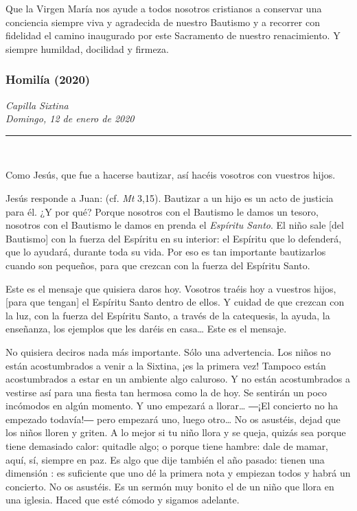 Que la Virgen María nos ayude a todos nosotros cristianos a conservar una conciencia siempre viva y agradecida de nuestro Bautismo y a recorrer con fidelidad el camino inaugurado por este Sacramento de nuestro renacimiento. Y siempre humildad, docilidad y firmeza.

\subsubsection{Homilía (2020)} \emph{Capilla Sixtina\\ Domingo, 12 de enero de 2020}

\begin{center}\rule{0.5\linewidth}{\linethickness}\end{center}

~

Como Jesús, que fue a hacerse bautizar, así hacéis vosotros con vuestros hijos.

Jesús responde a Juan:  (cf. \emph{Mt} 3,15). Bautizar a un hijo es un acto de justicia para él. ¿Y por qué? Porque nosotros con el Bautismo le damos un tesoro, nosotros con el Bautismo le damos en prenda el \emph{Espíritu Santo}. El niño sale {[}del Bautismo{]} con la fuerza del Espíritu en su interior: el Espíritu que lo defenderá, que lo ayudará, durante toda su vida. Por eso es tan importante bautizarlos cuando son pequeños, para que crezcan con la fuerza del Espíritu Santo.

Este es el mensaje que quisiera daros hoy. Vosotros traéis hoy a vuestros hijos, {[}para que tengan{]} el Espíritu Santo dentro de ellos. Y cuidad de que crezcan con la luz, con la fuerza del Espíritu Santo, a través de la catequesis, la ayuda, la enseñanza, los ejemplos que les daréis en casa\ldots{} Este es el mensaje.

No quisiera deciros nada más importante. Sólo una advertencia. Los niños no están acostumbrados a venir a la Sixtina, ¡es la primera vez! Tampoco están acostumbrados a estar en un ambiente algo caluroso. Y no están acostumbrados a vestirse así para una fiesta tan hermosa como la de hoy. Se sentirán un poco incómodos en algún momento. Y uno empezará a llorar\ldots{} ―¡El concierto no ha empezado todavía!― pero empezará uno, luego otro\ldots{} No os asustéis, dejad que los niños lloren y griten. A lo mejor si tu niño llora y se queja, quizás sea porque tiene demasiado calor: quitadle algo; o porque tiene hambre: dale de mamar, aquí, sí, siempre en paz. Es algo que dije también el año pasado: tienen una dimensión : es suficiente que uno dé la primera nota y empiezan todos y habrá un concierto. No os asustéis. Es un sermón muy bonito el de un niño que llora en una iglesia. Haced que esté cómodo y sigamos adelante.

